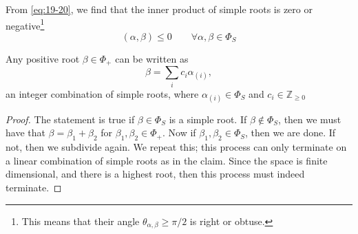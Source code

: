 \begin{corollary}
  \label{cl:19-iii}
  From \eqref{eq:19-20}, we find that the inner product of simple roots is zero or negative\footnote{This means that their angle $\theta_{\alpha, \beta} \geq {\pi} / {2}$ is right or obtuse.}
  \begin{equation}
    (\alpha, \beta) \leq 0 \qquad \forall \alpha, \beta \in \Phi_S
  \end{equation}
\end{corollary}
\begin{claim}
  \label{cl:19-4}
  Any positive root $\beta \in \Phi_+$ can be written as
  \begin{equation}
    \beta = \sum_i c_i \alpha_{(i)},
  \end{equation}
  an integer combination of simple roots, where $\alpha_{(i)} \in \Phi_S$ and $c_{i} \in \mathbb{Z}_{\geq 0}$
\end{claim}
\begin{proof}
  The statement is true if $\beta \in \Phi_S$ is a simple root.
  If $\beta \not \in \Phi_S$, then we must have that  $\beta = \beta_1 + \beta_2$ for $\beta_1, \beta_2 \in \Phi_+$.
  Now if $\beta_1, \beta_2 \in \Phi_S$, then we are done. If not, then we subdivide again. We repeat this; this process can only terminate on a linear combination of simple roots as in the claim. Since the space is finite dimensional, and there is a highest root, then this process must indeed terminate.
\end{proof}

